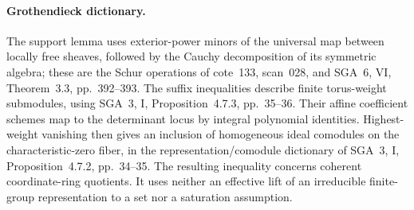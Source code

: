 \paragraph{Grothendieck dictionary.}
The support lemma uses exterior-power minors of the universal
map between locally free sheaves, followed by the Cauchy
decomposition of its symmetric algebra; these are the Schur
operations of cote~133, scan~028, and SGA~6, VI,
Theorem~3.3, pp.~392--393. The suffix inequalities describe
finite torus-weight submodules, using SGA~3, I,
Proposition~4.7.3, pp.~35--36. Their affine coefficient
schemes map to the determinant locus by integral polynomial
identities. Highest-weight vanishing then gives an inclusion
of homogeneous ideal comodules on the characteristic-zero
fiber, in the representation/comodule dictionary of SGA~3,
I, Proposition~4.7.2, pp.~34--35. The resulting inequality
concerns coherent coordinate-ring quotients. It uses neither
an effective lift of an irreducible finite-group representation
to a set nor a saturation assumption.
